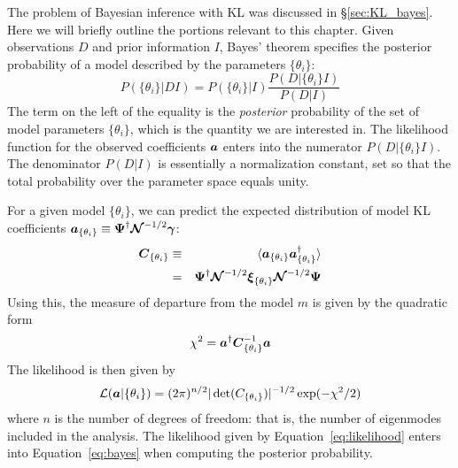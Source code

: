 The problem of Bayesian inference with KL was discussed in
\S\ref{sec:KL_bayes}.  Here we will briefly outline the portions relevant
to this chapter.
Given observations $D$ and prior information $I$, Bayes' theorem specifies the
posterior probability of a model described by the parameters $\{\theta_i\}$:
\begin{equation}
  \label{eq:bayes}
  P(\{\theta_i\}|DI) = P(\{\theta_i\}|I) \frac{P(D|\{\theta_i\}I)}{P(D|I)}
\end{equation}
The term on the left of the equality
is the \textit{posterior} probability of the set of
model parameters $\{\theta_i\}$, which is the quantity we are interested in.
The likelihood function for the observed coefficients $\boldsymbol{a}$
enters into the numerator $P(D|\{\theta_i\}I)$.  The denominator $P(D|I)$
is essentially a normalization constant, set so that the total probability
over the parameter space equals unity.

For a given model $\{\theta_i\}$, we can predict the expected distribution of model KL
coefficients $\boldsymbol{a}_{\{\theta_i\}} \equiv \boldsymbol{\Psi}^\dagger
\boldsymbol{\mathcal{N}}^{-1/2}\boldsymbol{\gamma}$:
\begin{eqnarray}
  \boldsymbol{C}_{\{\theta_i\}}
  & \equiv & \langle\boldsymbol{a}_{\{\theta_i\}}
  \boldsymbol{a}_{\{\theta_i\}}^\dagger\rangle\nonumber\\
  &=& \boldsymbol{\Psi}^\dagger \boldsymbol{\mathcal{N}}^{-1/2} 
  \boldsymbol{\xi}_{\{\theta_i\}}\boldsymbol{\mathcal{N}}^{-1/2}\boldsymbol{\Psi}
\end{eqnarray}
Using this, the measure of departure from the model $m$ is given by the
quadratic form
\begin{equation}
  \chi^2 = \boldsymbol{a}^\dagger\boldsymbol{C}_{\{\theta_i\}}^{-1}\boldsymbol{a}
\end{equation}
The likelihood is then given by
\begin{equation}
  \label{eq:likelihood}
  \mathcal{L}(\boldsymbol{a}|\{\theta_i\}) = 
  (2\pi)^{n/2} |\det(C_{\{\theta_i\}})|^{-1/2}
  \exp(-\chi^2/2)
\end{equation}
where $n$ is the number of degrees of freedom: that is, the number
of eigenmodes included in the analysis.  The likelihood given by
Equation~\ref{eq:likelihood} enters into Equation~\ref{eq:bayes} when
computing the posterior probability.

